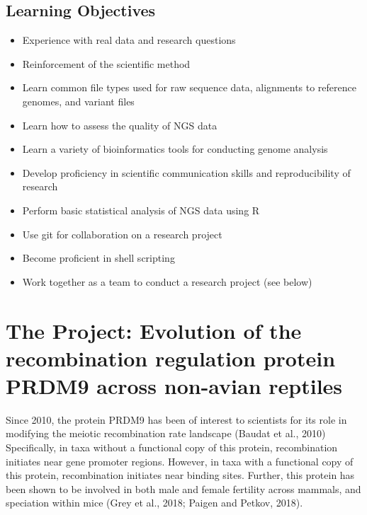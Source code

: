 \documentclass[
  letterpaper,
  DIV=11,
  numbers=noendperiod]{scrreprt}
\providecommand{\tightlist}{%
  \setlength{\itemsep}{0pt}\setlength{\parskip}{0pt}}
\begin{document}
\subsection{Learning Objectives}\label{learning-objectives-10}

\begin{itemize}
\tightlist
\item
  Experience with real data and research questions
\item
  Reinforcement of the scientific method
\item
  Learn common file types used for raw sequence data, alignments to
  reference genomes, and variant files
\item
  Learn how to assess the quality of NGS data
\item
  Learn a variety of bioinformatics tools for conducting genome analysis
\item
  Develop proficiency in scientific communication skills and
  reproducibility of research
\item
  Perform basic statistical analysis of NGS data using R
\item
  Use git for collaboration on a research project
\item
  Become proficient in shell scripting
\item
  Work together as a team to conduct a research project (see below)
\end{itemize}

\section{The Project: Evolution of the recombination regulation protein
PRDM9 across non-avian
reptiles}\label{the-project-evolution-of-the-recombination-regulation-protein-prdm9-across-non-avian-reptiles}

Since 2010, the protein PRDM9 has been of interest to scientists for its
role in modifying the meiotic recombination rate landscape (Baudat et
al., 2010) Specifically, in taxa without a functional copy of this
protein, recombination initiates near gene promoter regions. However, in
taxa with a functional copy of this protein, recombination initiates
near binding sites. Further, this protein has been shown to be involved
in both male and female fertility across mammals, and speciation within
mice (Grey et al., 2018; Paigen and Petkov, 2018).
\end{document}
